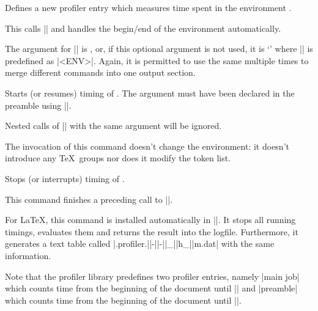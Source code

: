 \begin{command}{\pgfprofilenewforenvironment{}}
	Defines a new profiler entry which measures time spent in the environment . 

	This calls |\pgfprofilenew| and handles the begin/end of the environment automatically.
	
	The argument for |\pgfprofilenew| is , or, if this optional argument is not used, it is `\declareandlabel{\pgfprofileenv}' where |\pgfprofileenv| is predefined as |<ENV>|. Again, it is permitted to use the same  multiple times to merge different commands into one output section.

\end{command}


\begin{command}{\pgfprofilestart{}}
	Starts (or resumes) timing of . The argument must have been declared in the preamble using |\pgfprofilenew|.

	Nested calls of |\pgfprofilestart| with the same argument will be ignored.

	The invocation of this command doesn't change the environment: it doesn't introduce any \TeX\ groups nor does it modify the token list.
\end{command}

\begin{command}{\pgfprofileend{}}
	Stops (or interrupts) timing of . 
	
	This command finishes a preceding call to |\pgfprofilestart|.
\end{command}

\begin{command}{\pgfprofilepostprocess}
	For \LaTeX, this command is installed automatically in ||. It stops all running timings, evaluates them and returns the result into the logfile. Furthermore, it generates a text table called |\jobname.profiler.||-||-||_||h_||m.dat| with the same information.

	Note that the profiler library predefines two profiler entries, namely |main job| which counts time from the beginning of the document until |\pgfprofilepostprocess| and |preamble| which counts time from the beginning of the document until ||.
\end{command}

